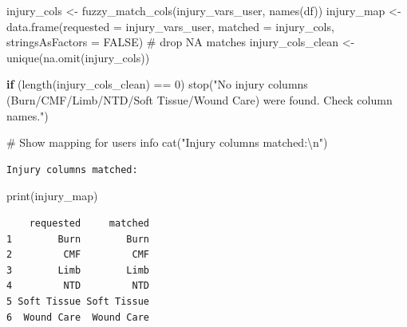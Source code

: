 \documentclass[
  letterpaper,
  DIV=11,
  numbers=noendperiod]{scrartcl}
\newenvironment{Shaded}{\begin{snugshade}}{\end{snugshade}}
\newcommand{\AttributeTok}[1]{\textcolor[rgb]{0.40,0.45,0.13}{#1}}
\newcommand{\CommentTok}[1]{\textcolor[rgb]{0.37,0.37,0.37}{#1}}
\newcommand{\ConstantTok}[1]{\textcolor[rgb]{0.56,0.35,0.01}{#1}}
\newcommand{\ControlFlowTok}[1]{\textcolor[rgb]{0.00,0.23,0.31}{\textbf{#1}}}
\newcommand{\DecValTok}[1]{\textcolor[rgb]{0.68,0.00,0.00}{#1}}
\newcommand{\FunctionTok}[1]{\textcolor[rgb]{0.28,0.35,0.67}{#1}}
\newcommand{\NormalTok}[1]{\textcolor[rgb]{0.00,0.23,0.31}{#1}}
\newcommand{\OtherTok}[1]{\textcolor[rgb]{0.00,0.23,0.31}{#1}}
\newcommand{\SpecialCharTok}[1]{\textcolor[rgb]{0.37,0.37,0.37}{#1}}
\newcommand{\StringTok}[1]{\textcolor[rgb]{0.13,0.47,0.30}{#1}}
\begin{document}
\begin{Shaded}
\begin{Highlighting}[]
\NormalTok{injury\_cols }\OtherTok{\textless{}{-}} \FunctionTok{fuzzy\_match\_cols}\NormalTok{(injury\_vars\_user, }\FunctionTok{names}\NormalTok{(df))}
\NormalTok{injury\_map }\OtherTok{\textless{}{-}} \FunctionTok{data.frame}\NormalTok{(}\AttributeTok{requested =}\NormalTok{ injury\_vars\_user, }\AttributeTok{matched =}\NormalTok{ injury\_cols, }\AttributeTok{stringsAsFactors =} \ConstantTok{FALSE}\NormalTok{)}
\CommentTok{\# drop NA matches}
\NormalTok{injury\_cols\_clean }\OtherTok{\textless{}{-}} \FunctionTok{unique}\NormalTok{(}\FunctionTok{na.omit}\NormalTok{(injury\_cols))}

\ControlFlowTok{if}\NormalTok{ (}\FunctionTok{length}\NormalTok{(injury\_cols\_clean) }\SpecialCharTok{==} \DecValTok{0}\NormalTok{) }\FunctionTok{stop}\NormalTok{(}\StringTok{"No injury columns (Burn/CMF/Limb/NTD/Soft Tissue/Wound Care) were found. Check column names."}\NormalTok{)}

\CommentTok{\# Show mapping for user\textquotesingle{}s info}
\FunctionTok{cat}\NormalTok{(}\StringTok{"Injury columns matched:}\SpecialCharTok{\textbackslash{}n}\StringTok{"}\NormalTok{)}
\end{Highlighting}
\end{Shaded}

\begin{verbatim}
Injury columns matched:
\end{verbatim}

\begin{Shaded}
\begin{Highlighting}[]
\FunctionTok{print}\NormalTok{(injury\_map)}
\end{Highlighting}
\end{Shaded}

\begin{verbatim}
    requested     matched
1        Burn        Burn
2         CMF         CMF
3        Limb        Limb
4         NTD         NTD
5 Soft Tissue Soft Tissue
6  Wound Care  Wound Care
\end{verbatim}
\end{document}
